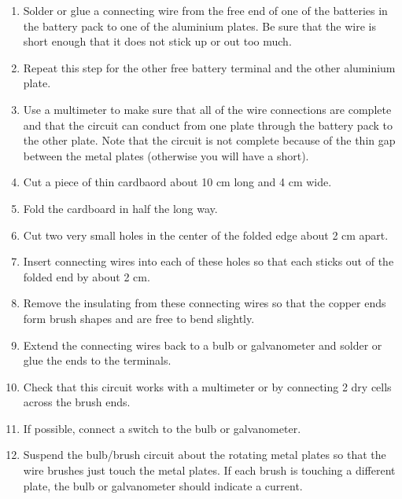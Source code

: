 \begin{enumerate}
\item{Solder or glue a connecting wire from the free end of one of the batteries in the battery pack to one of the aluminium plates. Be sure that the wire is short enough that it does not stick up or out too much.} 
\item{Repeat this step for the other free battery terminal and the other aluminium plate.} 
\item{Use a multimeter to make sure that all of the wire connections are complete and that the circuit can conduct from one plate through the battery pack to the other plate. Note that the circuit is not complete because of the thin gap between the metal plates (otherwise you will have a short).} 
\item{Cut a piece of thin cardbaord about 10 cm long and 4 cm wide.} 
\item{Fold the cardboard in half the long way.} 
\item{Cut two very small holes in the center of the folded edge about 2 cm apart.} 
\item{Insert connecting wires into each of these holes so that each sticks out of the folded end by about 2 cm.} 
\item{Remove the insulating from these connecting wires so that the copper ends form brush shapes and are free to bend slightly.} 
\item{Extend the connecting wires back to a bulb or galvanometer and solder or glue the ends to the terminals.} 
\item{Check that this circuit works with a multimeter or by connecting 2 dry cells across the brush ends.} 
\item{If possible, connect a switch to the bulb or galvanometer.} 
\item{Suspend the bulb/brush circuit about the rotating metal plates so that the wire brushes just touch the metal plates. If each brush is touching a different plate, the bulb or galvanometer should indicate a current.} 
\end{enumerate}

